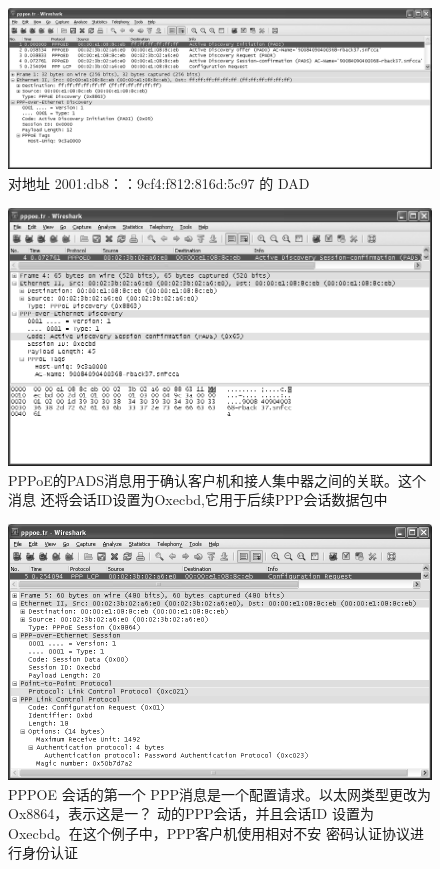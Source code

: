 \begin{figure}[H]
  \centering
  \includegraphics[scale=0.5]{imgs/6/6-31.png}
  \caption{对地址 2001:db8：：9cf4:f812:816d:5c97 的 DAD}
\end{figure}

\begin{figure}[H]
  \centering
  \includegraphics[scale=0.5]{imgs/6/6-32.png}
  \caption{PPPoE的PADS消息用于确认客户机和接人集中器之间的关联。这个消息
  还将会话ID设置为Oxecbd,它用于后续PPP会话数据包中}
\end{figure}

\begin{figure}[H]
  \centering
  \includegraphics[scale=0.5]{imgs/6/6-33.png}
  \caption{PPPOE 会话的第一个 PPP消息是一个配置请求。以太网类型更改为Ox8864，表示这是一？
    动的PPP会话，并且会话ID 设置为Oxecbd。在这个例子中，PPP客户机使用相对不安
  密码认证协议进行身份认证}
\end{figure}

